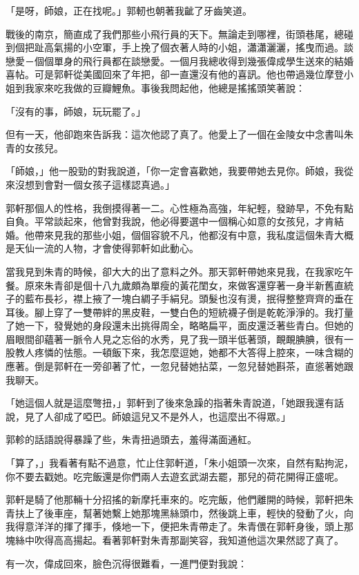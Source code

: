 \documentclass[b5paper,11pt,twoside,twocolumn]{ctexbook}
\begin{document}
「是呀，師娘，正在找呢。」郭軔也朝著我齜了牙齒笑道。

戰後的南京，簡直成了我們那些小飛行員的天下。無論走到哪裡，街頭巷尾，總碰到個把趾高氣揚的小空軍，手上挽了個衣著人時的小姐，瀟瀟灑灑，搖曳而過。談戀愛－個個單身的飛行員都在談戀愛。一個月我總收得到幾張偉成學生送來的結婚喜帖。可是郭軒從美國回來了年把，卻一直還沒有他的喜訊。他也帶過幾位摩登小姐到我家來吃我做的豆瓣鯉魚。事後我問起他，他總是搖搖頭笑著說：

「沒有的事，師娘，玩玩罷了。」


但有一天，他卻跑來告訴我：這次他認了真了。他愛上了一個在金陵女中念書叫朱青的女孩兒。

「師娘，」他一股勁的對我說道，「你一定會喜歡她，我要帶她去見你。師娘，我從來沒想到會對一個女孩子這樣認真過。」

郭軒那個人的性格，我倒摸得著一二。心性極為高強，年紀輕，發跡早，不免有點自負。平常談起來，他曾對我說，他必得要選中一個稱心如意的女孩兒，才肯結婚。他帶來見我的那些小姐，個個容貌不凡，他都沒有中意，我私度這個朱青大概是天仙一流的人物，才會使得郭軒如此動心。

當我見到朱青的時候，卻大大的出了意料之外。那天郭軒帶她來見我，在我家吃午餐。原來朱青卻是個十八九歲頗為單瘦的黃花閨女，來做客還穿著一身半新舊直統子的藍布長衫，襟上掖了一塊白綢子手絹兒。頭髮也沒有燙，抿得整整齊齊的垂在耳後。腳上穿了一雙帶絆的黑皮鞋，一雙白色的短統襪子倒是乾乾淨淨的。我打量了她一下，發覺她的身段還未出挑得周全，略略扁平，面皮還泛著些青白。但她的眉眼間卻蘊著一脈令人見之忘俗的水秀，見了我一頭半低著頭，靦靦腆腆，很有一股教人疼憐的怯態。一頓飯下來，我怎麼逗她，她都不大答得上腔來，一味含糊的應著。倒是郭軒在一旁卻著了忙，一忽兒替她拈菜，一忽兒替她斟茶，直慫著她跟我聊天。


「她這個人就是這麼彆扭，」郭軒到了後來急躁的指著朱青說道，「她跟我還有話說，見了人卻成了啞巴。師娘這兒又不是外人，也這麼出不得眾。」

郭軫的話語說得暴躁了些，朱青扭過頭去，羞得滿面通紅。

「算了，」我看著有點不過意，忙止住郭軒道，「朱小姐頭一次來，自然有點拘泥，你不要去戳她。吃完飯還是你們兩人去遊玄武湖去罷，那兒的荷花開得正盛呢。

郭軒是騎了他那輛十分招搖的新摩托車來的。吃完飯，他們離開的時候，郭軒把朱青扶上了後車座，幫著她繫上她那塊黑絲頭巾，然後跳上車，輕快的發動了火，向我得意洋洋的揮了揮手，倏地一下，便把朱青帶走了。朱青偎在郭軒身後，頭上那塊絲中吹得高高揚起。看著郭軒對朱青那副笑容，我知道他這次果然認了真了。

有一次，偉成回來，臉色沉得很難看，一進門便對我說：
\end{document}
